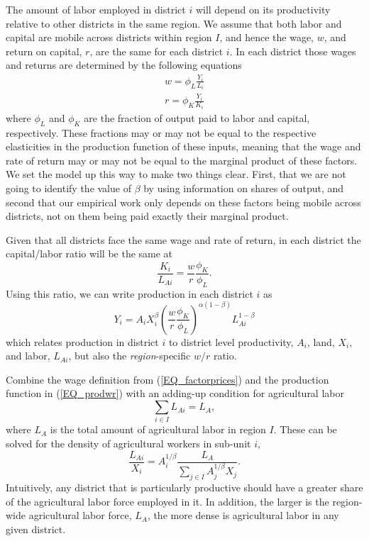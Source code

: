 \documentclass[11pt]{article}
\begin{document}
The amount of labor employed in district $i$ will depend on its productivity relative to other districts in the same region. We assume that both labor and capital are mobile across districts within region $I$, and hence the wage, $w$, and return on capital, $r$, are the same for each district $i$. In each district those wages and returns are determined by the following equations
\begin{eqnarray}
    w = \phi_L \frac{Y_i}{L_i} \\ \nonumber
    r = \phi_K \frac{Y_i}{K_i} \label{EQ_factorprices}
\end{eqnarray}
where $\phi_L$ and $\phi_K$ are the fraction of output paid to labor and capital, respectively. These fractions may or may not be equal to the respective elasticities in the production function of these inputs, meaning that the wage and rate of return may or may not be equal to the marginal product of these factors. We set the model up this way to make two things clear. First, that we are not going to identify the value of $\beta$ by using information on shares of output, and second that our empirical work only depends on these factors being mobile across districts, not on them being paid exactly their marginal product.

Given that all districts face the same wage and rate of return, in each district the capital/labor ratio will be the same at
\begin{equation}
    \frac{K_i}{L_{Ai}} = \frac{w}{r}\frac{\phi_K}{\phi_L}. \nonumber
\end{equation}
Using this ratio, we can write production in each district $i$ as
\begin{equation}
Y_{i} = A_{i} X_{i}^{\beta} \left(\frac{w}{r}\frac{\phi_K}{\phi_L}\right)^{\alpha(1-\beta)} L_{Ai}^{1-\beta} \label{EQ_prodwr}
\end{equation}
which relates production in district $i$ to district level productivity, $A_i$, land, $X_i$, and labor, $L_{Ai}$, but also the \textit{region}-specific $w/r$ ratio.

Combine the wage definition from (\ref{EQ_factorprices}) and the production function in (\ref{EQ_prodwr}) with an adding-up condition for agricultural labor 
\begin{equation}
\sum_{i\in I} L_{Ai} = L_A, \nonumber
\end{equation}
where $L_A$ is the total amount of agricultural labor in region $I$. These can be solved for the density of agricultural workers in sub-unit $i$,
\begin{equation}
\frac{L_{Ai}}{X_i} = A_{i}^{1/\beta}\frac{L_A}{\sum_{j\in I} A_{j}^{1/\beta}X_{j}}. \label{EQ_LaX}
\end{equation}
Intuitively, any district that is particularly productive should have a greater share of the agricultural labor force employed in it. In addition, the larger is the region-wide agricultural labor force, $L_A$, the more dense is agricultural labor in any given district.
\end{document}
